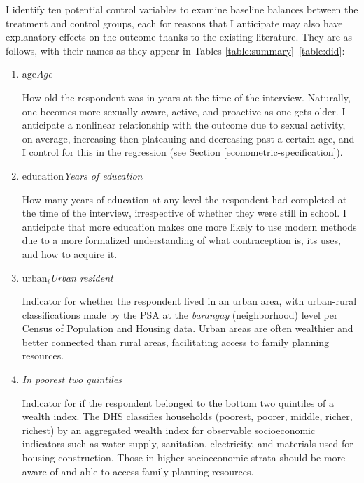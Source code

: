 \documentclass[12pt]{article}
\newcommand{\age}{%
    \ifmmode\ensuremath{\text{age}}\else\textit{Age}\fi
}
\newcommand{\educ}{%
    \ifmmode\ensuremath{\textrm{education}}\else\textit{Years of education}\fi
}
\newcommand{\urban}{%
    \ifmmode\ensuremath{\textrm{urban}_i}\else\textit{Urban resident}\fi
}
\newcommand{\poorest}{\textit{In poorest two quintiles}}
\begin{document}
    I identify ten potential control variables to examine baseline balances between the treatment and control groups, each for reasons that I anticipate may also have explanatory effects on the outcome thanks to the existing literature. 
    They are as follows, with their names as they appear in Tables \ref{table:summary}--\ref{table:did}:


    \begin{enumerate}
        \item \age{}
        
        How old the respondent was in years at the time of the interview.
        Naturally, one becomes more sexually aware, active, and proactive as one gets older.
        I anticipate a nonlinear relationship with the outcome due to sexual activity, on average, increasing then plateauing and decreasing past a certain age, and I control for this in the regression (see Section \ref{econometric-specification}).

        \item \educ{}
        
        How many years of education at any level the respondent had completed at the time of the interview, irrespective of whether they were still in school.
        I anticipate that more education makes one more likely to use modern methods due to a more formalized understanding of what contraception is, its uses, and how to acquire it.
    
        \item \urban{}
        
        Indicator for whether the respondent lived in an urban area, with urban-rural classifications made by the PSA at the \textit{barangay} (neighborhood) level per Census of Population and Housing data.
        Urban areas are often wealthier and better connected than rural areas, facilitating access to family planning resources.
    
        \item \poorest{}
        
        Indicator for if the respondent belonged to the bottom two quintiles of a wealth index.
        The DHS classifies households (poorest, poorer, middle, richer, richest) by an aggregated wealth index for observable socioeconomic indicators such as water supply, sanitation, electricity, and materials used for housing construction.
        Those in higher socioeconomic strata should be more aware of and able to access family planning resources.
    

\end{enumerate}
\end{document}
